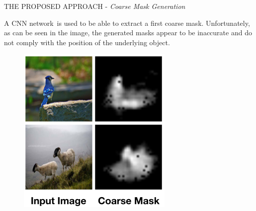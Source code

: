 \begin{frame}{THE PROPOSED APPROACH - \emph{Coarse Mask Generation}}
    \begin{minipage}{\linewidth}
        \centering
        \begin{minipage}{0.45\linewidth}
            A CNN network\footnotemark ~is used to be able 
            to extract a first coarse mask. 
            Unfortunately, as can be seen in 
            the image, the generated masks 
            appear to be inaccurate and do 
            not comply with the position of 
            the underlying object.
        \end{minipage}
        \hspace{0.05\linewidth}
        \begin{minipage}{0.45\linewidth}
            \begin{figure}[h!]
                \centering
                \includegraphics[width = 1 \linewidth]{images/paper6/coarse mask.png}
                \centering
            \end{figure}
        \end{minipage}
    \end{minipage}
\end{frame}

